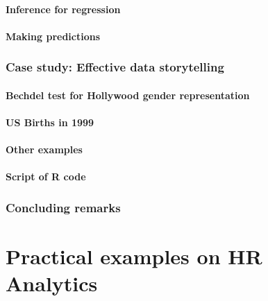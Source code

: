 \documentclass[12pt, krantz2,]{krantz}
\begin{document}
\hypertarget{house-prices-inference-for-regression}{%
\subsection{Inference for regression}\label{house-prices-inference-for-regression}}

\hypertarget{house-prices-making-predictions}{%
\subsection{Making predictions}\label{house-prices-making-predictions}}

\hypertarget{data-journalism}{%
\section{Case study: Effective data storytelling}\label{data-journalism}}

\hypertarget{bechdel-test-for-hollywood-gender-representation}{%
\subsection{Bechdel test for Hollywood gender representation}\label{bechdel-test-for-hollywood-gender-representation}}

\hypertarget{us-births-in-1999}{%
\subsection{US Births in 1999}\label{us-births-in-1999}}

\hypertarget{other-examples}{%
\subsection{Other examples}\label{other-examples}}

\hypertarget{script-of-r-code-1}{%
\subsection{Script of R code}\label{script-of-r-code-1}}

\hypertarget{concluding-remarks}{%
\section*{Concluding remarks}\label{concluding-remarks}}


\hypertarget{part-practical-examples-on-hr-analytics}{%
\part{Practical examples on HR Analytics}\label{part-practical-examples-on-hr-analytics}}
\end{document}
